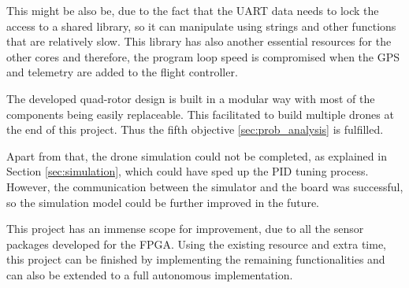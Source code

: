  This might be also be, due to the fact that the UART data needs to lock the access to a shared library, so it can manipulate using strings and other functions that are relatively slow. This library has also another essential resources for the other cores and therefore, the program loop speed is compromised when the GPS and telemetry are added to the flight controller. 

The developed quad-rotor design is built in a modular way with most of the components being easily replaceable. This facilitated to build multiple drones at the end of this project. Thus the fifth objective \ref{sec:prob_analysis} is fulfilled.

Apart from that, the drone simulation could not be completed, as explained in Section \ref{sec:simulation}, which could have sped up the PID tuning process. However, the communication between the simulator and the board was successful, so the simulation model could be further improved in the future.

This project has an immense scope for improvement, due to all the sensor packages developed for the FPGA. Using the existing resource and extra time, this project can be finished by implementing the remaining functionalities and can also be extended to a full autonomous implementation.

